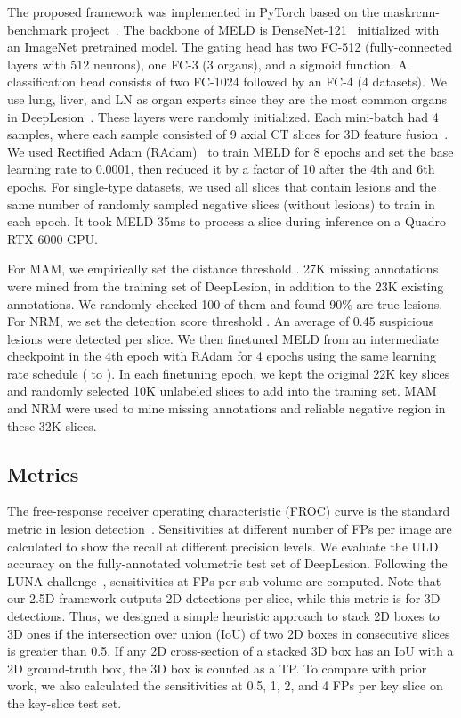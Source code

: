 \documentclass[runningheads]{llncs}
\begin{document}
The proposed framework was implemented in PyTorch based on the maskrcnn-benchmark project~\cite{massa2018mrcnn}. The backbone of MELD is DenseNet-121~\cite{Huang2017DenseNet} initialized with an ImageNet pretrained model. The gating head has two FC-512 (fully-connected layers with 512 neurons), one FC-3 (3 organs), and a sigmoid function. A classification head consists of two FC-1024 followed by an FC-4 (4 datasets). We use lung, liver, and LN as organ experts since they are the most common organs in DeepLesion~\cite{Yan2019Lesa}. These layers were randomly initialized. Each mini-batch had 4 samples, where each sample consisted of 9 axial CT slices for 3D feature fusion~\cite{Yan2019MULAN}. We used Rectified Adam (RAdam)~\cite{liu2019radam} to train MELD for 8 epochs and set the base learning rate to 0.0001, then reduced it by a factor of 10 after the 4th and 6th epochs. For single-type datasets, we used all slices that contain lesions and the same number of randomly sampled negative slices (without lesions) to train in each epoch. It took MELD 35ms to process a slice during inference on a Quadro RTX 6000 GPU. 

For MAM, we empirically set the distance threshold . 27K missing annotations were mined from the training set of DeepLesion, in addition to the 23K existing annotations. We randomly checked 100 of them and found 90\% are true lesions. For NRM, we set the detection score threshold . An average of 0.45 suspicious lesions were detected per slice. We then finetuned MELD from an intermediate checkpoint in the 4th epoch with RAdam for 4 epochs using the same learning rate schedule ( to ). In each finetuning epoch, we kept the original 22K key slices and randomly selected 10K unlabeled slices to add into the training set. MAM and NRM were used to mine missing annotations and reliable negative region in these 32K slices.

\subsection{Metrics}
\label{subsec:metrics}

The free-response receiver operating characteristic (FROC) curve is the standard metric in lesion detection~\cite{Setio2017LUNA,Yan2018DeepLesion,Shin2016TMICNN}. Sensitivities at different number of FPs per image are calculated to show the recall at different precision levels. We evaluate the ULD accuracy on the fully-annotated volumetric test set of DeepLesion. Following the LUNA challenge~\cite{Setio2017LUNA}, sensitivities at  FPs per sub-volume are computed. Note that our 2.5D framework outputs 2D detections per slice, while this metric is for 3D detections. Thus, we designed a simple heuristic approach to stack 2D boxes to 3D ones if the intersection over union (IoU) of two 2D boxes in consecutive slices is greater than 0.5. If any 2D cross-section of a stacked 3D box has an IoU  with a 2D ground-truth box, the 3D box is counted as a TP. To compare with prior work, we also calculated the sensitivities at 0.5, 1, 2, and 4 FPs per key slice on the key-slice test set.
\end{document}
